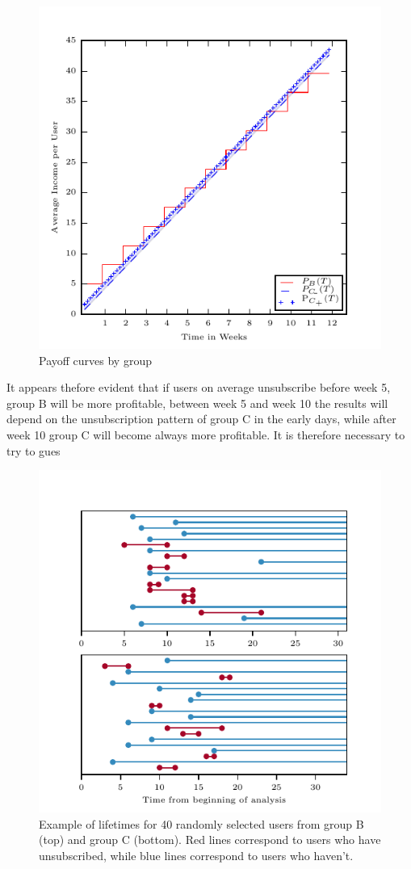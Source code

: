 \documentclass[paper=a4, fontsize=10pt]{report}
\begin{document}
\begin{figure}[h!]
\centering
\captionsetup{justification=centering}
\includegraphics[width=.9\columnwidth]{profit.pdf}
\caption{Payoff curves by group}
\label{fig:profit}
\end{figure}


It appears thefore evident that if users on average unsubscribe before week 5, group B will be more profitable, between
week 5 and week 10 the results will depend on the unsubscription pattern of group C in the early days, while after week 10 group C
will become always more profitable. It is therefore necessary to try to gues
\begin{figure}[h!]
\centering
\captionsetup{justification=centering}
\includegraphics[width=.9\columnwidth]{lifetime.pdf}
\caption{Example of lifetimes for 40 randomly selected users from group B (top) and group C (bottom). Red lines
correspond to users who have unsubscribed, while blue lines correspond to users who haven't.}
\label{fig:lifetimes}
\end{figure}
\end{document}
